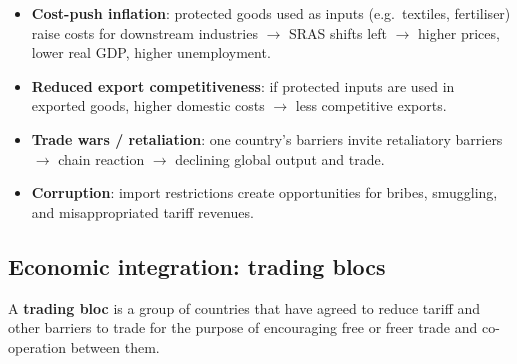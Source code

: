 \begin{itemize}
  \item \textbf{Cost-push inflation}: protected goods used as inputs (e.g.\ textiles, fertiliser) raise costs for downstream industries $\to$ SRAS shifts left $\to$ higher prices, lower real GDP, higher unemployment.
  \item \textbf{Reduced export competitiveness}: if protected inputs are used in exported goods, higher domestic costs $\to$ less competitive exports.
  \item \textbf{Trade wars / retaliation}: one country's barriers invite retaliatory barriers $\to$ chain reaction $\to$ declining global output and trade.
  \item \textbf{Corruption}: import restrictions create opportunities for bribes, smuggling, and misappropriated tariff revenues.
\end{itemize}
\subsection{Economic integration: trading blocs}
A \textbf{trading bloc} is a group of countries that have agreed to reduce tariff and other barriers to trade for the purpose of encouraging free or freer trade and co-operation between them.


